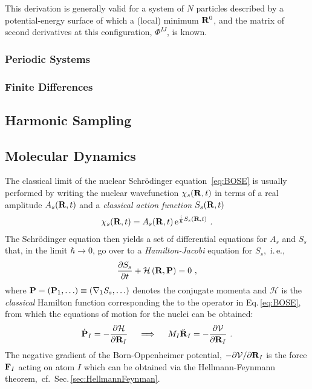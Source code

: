 This derivation is generally valid for a system of $N$ particles described by a potential-energy surface of which a (local) minimum ${\bf R}^0$, and the matrix of second derivatives at this configuration, $\Phi^{IJ}$, is known.

\subsubsection{Periodic Systems}


\subsubsection{Finite Differences}
\subsection{Harmonic Sampling}

\subsection{Molecular Dynamics}
The classical limit of the nuclear Schr\"odinger equation~\eqref{eq:BOSE} is usually performed by writing the nuclear wavefunction $\chi_s ({\bf R}, t)$ in terms of a real amplitude $A_s({\bf R}, t)$ and a \emph{classical action function} $S_s({\bf R}, t)$~\cite{Dirac1981,Landau2013,Marx2009}
\begin{align}
	\chi_s({\bf R}, t) = A_s({\bf R}, t) \, {\rm e}^{\frac{{\rm i}}{\hbar} S_s({\bf R}, t)}~.
	\label{eq:class.1}
\end{align}
The Schr\"odinger equation then yields a set of differential equations for $A_s$ and $S_s$ that, in the limit $\hbar \to 0$, go over to a \emph{Hamilton-Jacobi} equation for $S_s$,~i.\,e.,~
\begin{align}
  \frac{\partial S_s}{\partial t} + \mathcal H \left({\bf R}, {\bf P}\right)
  = 0~,
  \label{eq:HamiltonJacobi}
\end{align}
where ${\bf P} = ({\bf P}_1, \ldots) \equiv ({\bf \nabla}_1 S_s, \ldots)$ denotes the conjugate momenta and $\mathcal H$ is the \emph{classical} Hamilton function corresponding the to the operator in Eq.\,\eqref{eq:BOSE}, from which the equations of motion for the nuclei can be obtained:
\begin{align}
  \dot{{\bf P}}_I 
    = -\frac{\partial \mathcal H}{\partial {\bf R}_I}
    \quad\implies\quad M_I \ddot{\bf R}_I
    = -\frac{\partial \mathcal V}{\partial {\bf R}_I}~.
\end{align}
The negative gradient of the Born-Oppenheimer potential, 
$-\partial \mathcal V / \partial {\bf R}_I$ is the force ${\bf F}_I$ acting on atom $I$ which can be obtained via the Hellmann-Feynmann theorem,~cf.~Sec.\,\ref{sec:HellmannFeynman}.

